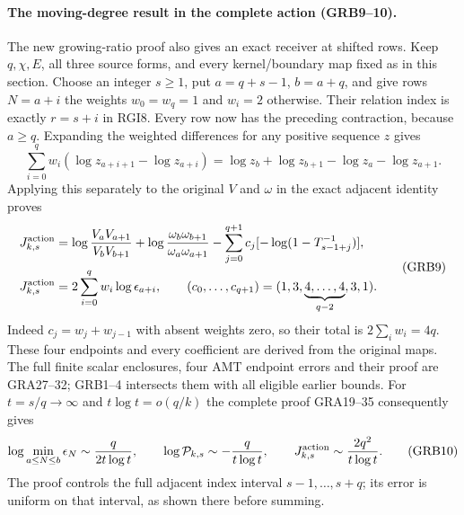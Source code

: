 \documentclass[11pt,a4paper]{article}
\begin{document}
\label{GRBUILD:GRB_SHIFTED_ACTION:start}
\paragraph{The moving-degree result in the complete action (GRB9--10).}
The new growing-ratio proof also gives an exact receiver at shifted rows.
Keep $q,\chi,E$, all three source forms, and every kernel/boundary map
fixed as in this section.  Choose an integer $s\ge1$, put $a=q+s-1$,
$b=a+q$, and give rows $N=a+i$ the weights $w_0=w_q=1$ and $w_i=2$
otherwise.  Their relation index is exactly $r=s+i$ in RGI8.  Every row
now has the preceding contraction, because $a\ge q$.  Expanding the
weighted differences for any positive sequence $z$ gives
\[
 \sum_{i=0}^q w_i(\log z_{a+i+1}-\log z_{a+i})
 =\log z_b+\log z_{b+1}-\log z_a-\log z_{a+1}.
\]
Applying this separately to the original $V$ and $\omega$ in the exact
adjacent identity proves
\begin{equation}
\begin{split}
 J_{k,s}^{\rm action}
 &=\log\frac{V_aV_{a+1}}{V_bV_{b+1}}
  +\log\frac{\omega_b\omega_{b+1}}{\omega_a\omega_{a+1}}
  -\sum_{j=0}^{q+1}c_j[-\log(1-T_{s-1+j}^{-1})],\\
 J_{k,s}^{\rm action}&=2\sum_{i=0}^qw_i\log\epsilon_{a+i},\qquad
 (c_0,\ldots,c_{q+1})=(1,3,\underbrace{4,\ldots,4}_{q-2},3,1).
\end{split}\tag{GRB9}\label{GRB:shifted-action}
\end{equation}
Indeed $c_j=w_j+w_{j-1}$ with absent weights zero, so their total is
$2\sum_iw_i=4q$.  These four endpoints and every coefficient are derived
from the original maps.  The full finite scalar enclosures, four AMT
endpoint errors and their proof are GRA27--32; GRB1--4 intersects them
with all eligible earlier bounds.  For $t=s/q\to\infty$ and
$t\log t=o(q/k)$ the complete proof GRA19--35 consequently gives
\begin{equation}
 \log\min_{a\le N\le b}\epsilon_N\sim\frac{q}{2t\log t},\qquad
 \log\mathcal P_{k,s}\sim-\frac{q}{t\log t},\qquad
 J_{k,s}^{\rm action}\sim\frac{2q^2}{t\log t}.
\tag{GRB10}\label{GRB:shifted-rates}
\end{equation}
The proof controls the full adjacent index interval $s-1,\ldots,s+q$;
its error is uniform on that interval, as shown there before summing.
\end{document}
